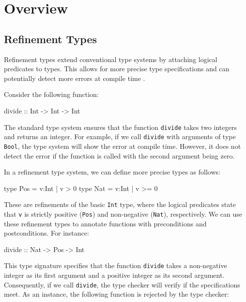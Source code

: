 \documentclass[]{rptuseminar}
\begin{document}

\section{Overview}
\label{sec:background}

\subsection{Refinement Types}  
Refinement types extend conventional type systems by attaching logical predicates to types.
This allows for more precise type specifications and can potentially detect more errors 
at compile time \cite{vazou_refinement_2014}.

Consider the following function:

\begin{haskell}  
divide :: Int -> Int -> Int  
\end{haskell} 

The standard type system ensures that the function \texttt{divide} takes two integers and 
returns an integer. For example, if we call \texttt{divide} with arguments of type 
\texttt{Bool}, the type system will show the error at compile time. 
However, it does not detect the error if the function is called with the second 
argument being zero.

In a refinement type system, we can define more precise types as follows: 

\begin{haskell}  
type Pos = {v:Int | v > 0}  
type Nat = {v:Int | v >= 0}  
\end{haskell}  

These are refinements of the basic \texttt{Int} type, where the logical predicates state 
that \texttt{v} is strictly positive (\texttt{Pos}) and non-negative (\texttt{Nat}), 
respectively. We can use these refinement types to annotate functions with 
preconditions and postconditions. For instance:

\begin{haskell}  
divide :: Nat -> Pos -> Int  
\end{haskell}  

This type signature specifies that the function \texttt{divide} takes a non-negative 
integer as its first argument and a positive integer as its second argument. Consequently, if we call
\texttt{divide}, the type checker will verify if the specifications meet.
As an instance, the following function is rejected by the type checker:
\end{document}
